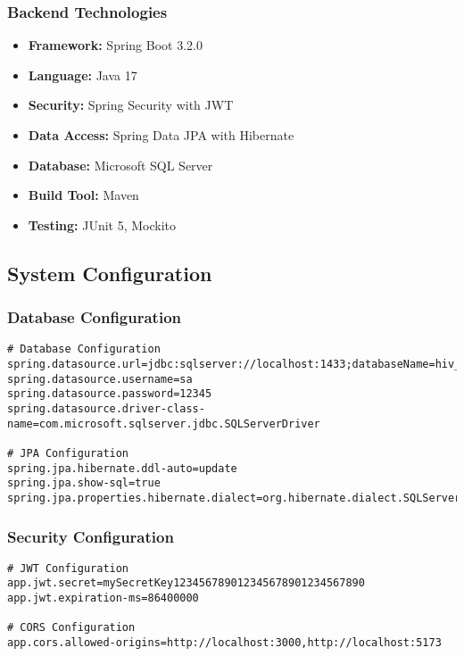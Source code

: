 \documentclass[12pt,a4paper]{article}
\begin{document}
\subsubsection{Backend Technologies}
\begin{itemize}
    \item \textbf{Framework:} Spring Boot 3.2.0
    \item \textbf{Language:} Java 17
    \item \textbf{Security:} Spring Security with JWT
    \item \textbf{Data Access:} Spring Data JPA with Hibernate
    \item \textbf{Database:} Microsoft SQL Server
    \item \textbf{Build Tool:} Maven
    \item \textbf{Testing:} JUnit 5, Mockito
\end{itemize}

\subsection{System Configuration}

\subsubsection{Database Configuration}
\begin{lstlisting}[caption=Database Configuration]
# Database Configuration
spring.datasource.url=jdbc:sqlserver://localhost:1433;databaseName=hiv_clinic
spring.datasource.username=sa
spring.datasource.password=12345
spring.datasource.driver-class-name=com.microsoft.sqlserver.jdbc.SQLServerDriver

# JPA Configuration
spring.jpa.hibernate.ddl-auto=update
spring.jpa.show-sql=true
spring.jpa.properties.hibernate.dialect=org.hibernate.dialect.SQLServerDialect
\end{lstlisting}

\subsubsection{Security Configuration}
\begin{lstlisting}[caption=Security Configuration]
# JWT Configuration
app.jwt.secret=mySecretKey123456789012345678901234567890
app.jwt.expiration-ms=86400000

# CORS Configuration
app.cors.allowed-origins=http://localhost:3000,http://localhost:5173
\end{lstlisting}
\end{document}
